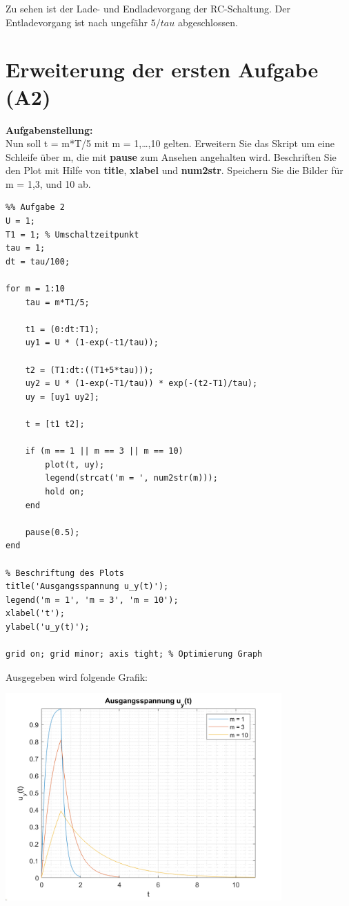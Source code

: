 Zu sehen ist der Lade- und Endladevorgang der RC-Schaltung. Der Entladevorgang ist nach ungefähr $5/tau$ abgeschlossen.

\vspace{0.5cm}

\section{Erweiterung der ersten Aufgabe (A2)}

\textbf{Aufgabenstellung:\\}
Nun soll t = m*T/5 mit m = 1,…,10 gelten. Erweitern Sie das Skript um eine Schleife über m, die mit \textbf{pause} zum Ansehen angehalten wird. Beschriften Sie den Plot mit Hilfe von \textbf{title}, \textbf{xlabel} und \textbf{num2str}. Speichern Sie die Bilder für m = 1,3, und 10 ab.

\vspace{1.5cm}

\begin{lstlisting}
%% Aufgabe 2
U = 1; 
T1 = 1; % Umschaltzeitpunkt
tau = 1; 
dt = tau/100;

for m = 1:10
	tau = m*T1/5;
	
	t1 = (0:dt:T1);
	uy1 = U * (1-exp(-t1/tau));
	
	t2 = (T1:dt:((T1+5*tau)));
	uy2 = U * (1-exp(-T1/tau)) * exp(-(t2-T1)/tau);
	uy = [uy1 uy2];
	
	t = [t1 t2];
	
	if (m == 1 || m == 3 || m == 10)
		plot(t, uy);
		legend(strcat('m = ', num2str(m)));
		hold on;
	end
	
	pause(0.5);	
end
	
% Beschriftung des Plots
title('Ausgangsspannung u_y(t)');
legend('m = 1', 'm = 3', 'm = 10');
xlabel('t');
ylabel('u_y(t)');

grid on; grid minor; axis tight; % Optimierung Graph
\end{lstlisting}

\vspace{1cm}

Ausgegeben wird folgende Grafik:

\begin{center}
	\includegraphics[width=300pt]{img/aufgabe2.png}
\end{center}

